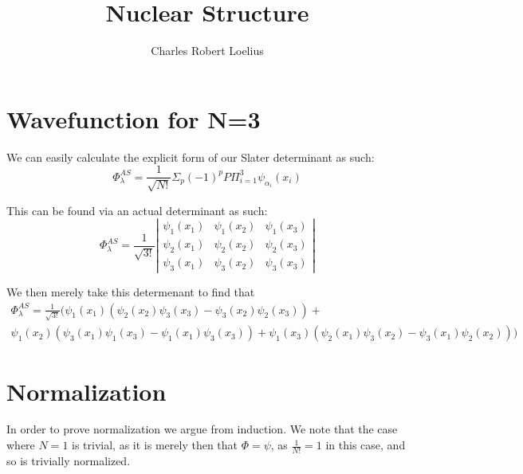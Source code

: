 \documentclass[11pt]{article} %
\title{Nuclear Structure}
\author{Charles Robert Loelius}
\begin{document}
\maketitle


\section{Wavefunction for N=3}

We can easily calculate the explicit form of our Slater determinant as such:\\

\begin{equation}
\Phi^{AS}_\lambda =\frac{1}{\sqrt{N!}} \Sigma_p (-1)^p P \Pi_{i=1}^3 \psi_{\alpha_i}(x_i)
\end{equation}

This can be found via an actual determinant as such:\\
\begin{equation}
\Phi^{AS}_\lambda = \frac{1}{\sqrt{3!}} \left| \begin{array}{ccc}
\psi_1 (x_1) & \psi_1 (x_2) & \psi_1(x_3) \\
\psi_2(x_1) & \psi_2(x_2) & \psi_2(x_3) \\
\psi_3(x_1) & \psi_3(x_2) & \psi_3(x_3)  \end{array}\right|
\end{equation}

We then merely take this determenant to find that\\

\begin{equation}
\begin{split}
\Phi^{AS}_\lambda =\frac{1}{\sqrt{3!}}(\psi_1(x_1)(\psi_2(x_2)\psi_3(x_3)-\psi_3(x_2)\psi_2(x_3))+ \\ \psi_1(x_2)(\psi_3(x_1)\psi_1(x_3)-\psi_1(x_1)\psi_3(x_3))+\psi_1(x_3)(\psi_2(x_1)\psi_3(x_2)-\psi_3(x_1)\psi_2(x_2)))
\end{split}
\end{equation}

\section{Normalization}

In order to prove normalization we argue from induction. We note that the case where $N=1$ is trivial, as it is merely then that $\Phi=\psi$, as $\frac{1}{N!}=1$ in this case, and so is trivially normalized.\\
\end{document}

